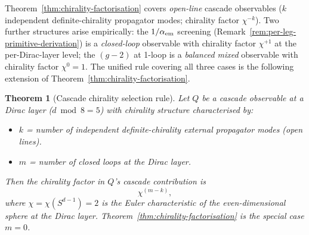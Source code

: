 \documentclass[12pt,a4paper]{article}
\newtheorem{theorem}{Theorem}[section]
\begin{document}
Theorem~\ref{thm:chirality-factorisation} covers \emph{open-line} cascade observables ($k$ independent definite-chirality propagator modes; chirality factor $\chi^{-k}$). Two further structures arise empirically: the $1/\alpha_{\rm em}$ screening (Remark~\ref{rem:per-leg-primitive-derivation}) is a \emph{closed-loop} observable with chirality factor $\chi^{+1}$ at the per-Dirac-layer level; the $(g{-}2)$ at 1-loop is a \emph{balanced mixed} observable with chirality factor $\chi^0 = 1$. The unified rule covering all three cases is the following extension of Theorem~\ref{thm:chirality-factorisation}.

\begin{theorem}[Cascade chirality selection rule]\label{thm:chirality-selection-rule}
Let $Q$ be a cascade observable at a Dirac layer ($d \bmod 8 = 5$) with chirality structure characterised by:
\begin{itemize}[nosep]
\item $k$ = number of independent definite-chirality external propagator modes (open lines).
\item $m$ = number of closed loops at the Dirac layer.
\end{itemize}
Then the chirality factor in $Q$'s cascade contribution is
\[
\chi^{(m - k)},
\]
where $\chi = \chi(S^{d-1}) = 2$ is the Euler characteristic of the even-dimensional sphere at the Dirac layer. Theorem~\ref{thm:chirality-factorisation} is the special case $m = 0$.
\end{theorem}
\end{document}
